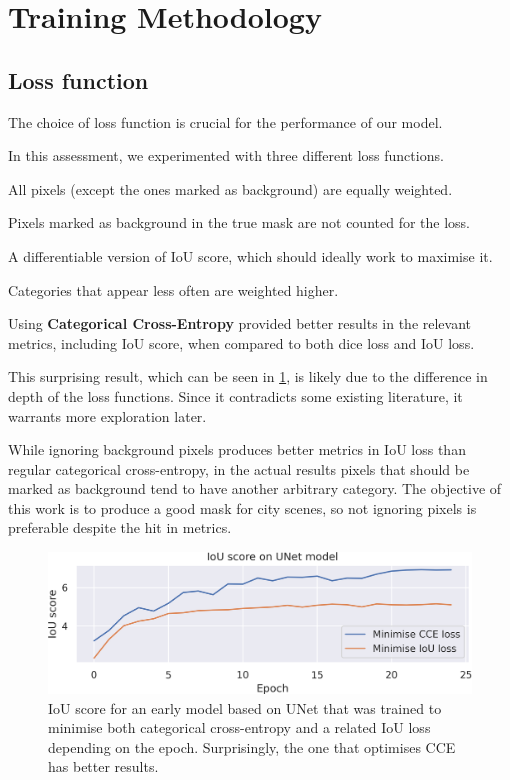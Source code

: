\newcommand{\lt}{L\textsubscript{2}}

\section{Training Methodology}

\subsection{Loss function}

The choice of loss function is crucial for the performance of our model.

In this assessment, we experimented with three different loss functions.

\begin{description}[style=nextline]
	\item[Categorical Cross-Entropy Loss] All pixels (except the ones marked as background) are equally weighted.
	\item[CCE loss ignoring background pixels] Pixels marked as background in the true mask are not counted for the loss.
	\item[Intersection over Union Loss] A differentiable version of IoU score, which should ideally work to maximise it.
	\item[Dice Loss] Categories that appear less often are weighted higher\cite{dice_loss}.
\end{description}

Using \textbf{Categorical Cross-Entropy} provided better results in the relevant metrics, including IoU score, when compared to both dice loss and IoU loss.

This surprising result, which can be seen in \cref{iou_vs_cce}, is likely due to the difference in depth of the loss functions.
Since it contradicts some existing literature\cite{dice_loss}, it warrants more exploration later.

While ignoring background pixels produces better metrics in IoU loss than regular categorical cross-entropy, in the actual results pixels that should be marked as background tend to have another arbitrary category.
The objective of this work is to produce a good mask for city scenes, so not ignoring pixels is preferable despite the hit in metrics.

\begin{figure}[b]
	\centering
	\includegraphics[width=.90\textwidth]{cce_vs_iou_loss.png}
	\caption{IoU score for an early model based on UNet that was trained to minimise both categorical cross-entropy and a related IoU loss depending on the epoch. Surprisingly, the one that optimises CCE has better results.}
	\label{iou_vs_cce}
\end{figure}

